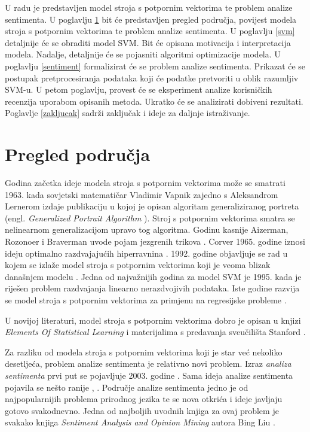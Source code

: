 \documentclass[times, utf8, zavrsni, numeric]{fer}
\begin{document}
\par U radu je predstavljen model stroja s potpornim vektorima te problem analize sentimenta.
U poglavlju \ref{ppodrucja} bit će predstavljen pregled područja, povijest modela stroja s potpornim vektorima te problem analize sentimenta.
U poglavlju \ref{svm} detaljnije će se obraditi model SVM.
Bit će opisana motivacija i interpretacija modela.
Nadalje, detaljnije će se pojasniti algoritmi optimizacije modela.
U poglavlju \ref{sentiment} formalizirat će se problem analize sentimenta.
Prikazat će se postupak pretprocesiranja podataka koji će podatke pretvoriti u oblik razumljiv SVM-u.
U petom poglavlju, provest će se eksperiment analize korisničkih recenzija uporabom opisanih metoda.
Ukratko će se analizirati dobiveni rezultati.
Poglavlje \ref{zakljucak} sadrži zaključak i ideje za daljnje istraživanje. 

\chapter{Pregled područja} \label{ppodrucja}
Godina začetka ideje modela stroja s potpornim vektorima može se smatrati 1963. kada sovjetski 
matematičar Vladimir Vapnik zajedno s Aleksandrom Lernerom izdaje publikaciju u kojoj je opisan
algoritam generaliziranog portreta (engl. \textit{Generalized Portrait Algorithm} \cite{vapnik1963}). 
Stroj s potpornim vektorima smatra se nelinearnom generalizacijom upravo tog algoritma.
Godinu kasnije Aizerman, Rozonoer i Braverman uvode pojam jezgrenih trikova \cite{Aizerman67theoretical}.
Corver 1965. godine iznosi ideju optimalno razdvajajućih hiperravnina \cite{cover1965browse}.
1992. godine objavljuje se rad u kojem se izlaže model stroja s potpornim vektorima koji je veoma
blizak današnjem modelu \cite{Boser:1992:TAO:130385.130401}.
Jedna od najvažnijih godina za model SVM je 1995. kada je riješen problem razdvajanja linearno 
nerazdvojivih podataka. Iste godine razvija se model stroja s potpornim vektorima za primjenu na regresijske 
probleme \cite{Cortes:1995:SN:218919.218929}.

\par U novijoj literaturi, model stroja s potpornim vektorima dobro je opisan u knjizi 
\textit{Elements Of Statistical Learning} \cite{hastie01statisticallearning} i materijalima s predavanja
sveučilišta Stanford \cite{NgSVM}.

\par Za razliku od modela stroja s potpornim vektorima koji je star već nekoliko desetljeća, 
problem analize sentimenta je relativno novi problem.
Izraz \textit{analiza sentimenta} prvi put se pojavljuje 2003. godine 
\cite{Nasukawa:2003:SAC:945645.945658}.
Sama ideja analize sentimenta pojavila se nešto ranije \cite{Pang+Lee+Vaithyanathan:02a}, 
\cite{wiebe-bruce-o'hara:1999:ACL}.
Područje analize sentimenta jedno je od najpopularnijih problema prirodnog jezika te se nova otkrića
i ideje javljaju gotovo svakodnevno. Jedna od najboljih uvodnih knjiga za ovaj problem je svakako
knjiga \textit{Sentiment Analysis and Opinion Mining} autora Bing Liu \cite{Liu:2012:SAO:3019323}.
\end{document}
